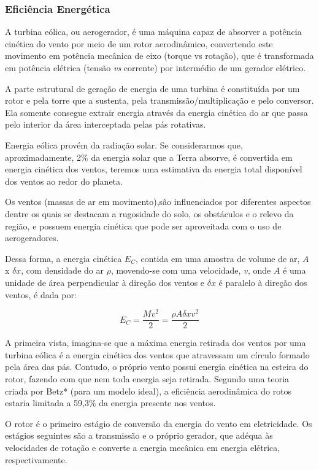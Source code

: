   \subsubsection{Eficiência Energética}
  
    A turbina eólica, ou aerogerador, é uma máquina capaz de absorver a potência cinética do vento por meio de um rotor
    aerodinâmico, convertendo este movimento em potência mecânica de eixo (torque vs rotação),  que é transformada em
    potência elétrica (tensão \textit{vs} corrente) por intermédio de um gerador elétrico.
    
    A parte estrutural de geração de energia de uma turbina é constituída por um rotor e pela torre que a sustenta,
    pela transmissão/multiplicação e pelo conversor. Ela somente consegue extrair energia através da energia cinética do 
    ar que passa pelo interior da área interceptada pelas pás rotativas.  
    
    Energia eólica provém da radiação solar. Se considerarmos que, aproximadamente, 2\% da energia solar que a Terra absorve,
    é convertida em energia cinética dos ventos, teremos uma estimativa da energia total disponível dos ventos ao redor
    do planeta.
    
    Os ventos (massas de ar em movimento),são influenciados por diferentes aspectos dentre os quais se destacam a rugosidade
    do solo, os obstáculos e o relevo da região, e possuem energia cinética que pode ser aproveitada com o uso de aerogeradores.
    
    Dessa forma, a energia cinética $E_C$, contida em uma amostra de volume de ar, $A$ x $\delta x$, com densidade do ar $\rho$, 
    movendo-se com uma velocidade, $v$,  onde $A$ é uma unidade de área perpendicular à direção dos ventos e $\delta x$ é paralelo 
    à direção dos  ventos, é dada por:
    
    $$ E_C = \frac{Mv^2}{2} = \frac{\rho A {\delta x} v^2}{2} $$
    
    A primeira vista, imagina-se que a máxima energia retirada dos ventos por uma turbina eólica é a energia cinética dos
    ventos que atravessam um círculo formado pela área das pás. Contudo, o próprio vento possui energia cinética na esteira
    do rotor, fazendo com que nem toda energia seja retirada. Segundo uma teoria criada por Betz* (para um modelo ideal), 
    a eficiência aerodinâmica do rotos estaria limitada a 59,3\% da energia presente nos ventos.
    
    O rotor é o primeiro estágio de conversão da energia do vento em eletricidade. Os estágios seguintes são a transmissão
    e o próprio gerador, que adéqua às velocidades de rotação e converte a energia mecânica em energia elétrica, 
    respectivamente.
    
